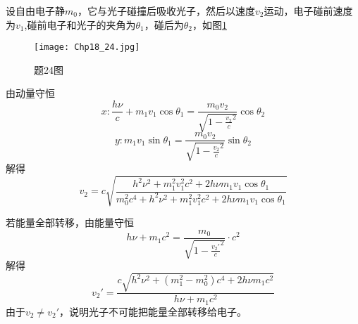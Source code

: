 \exercise

\solve 设自由电子静$m_0$，它与光子碰撞后吸收光子，然后以速度$v_2$运动，电子碰前速度为$v_1$,碰前电子和光子的夹角为$\theta_1$，碰后为$\theta_2$，如图\ref{Chp18_24}

\begin{figure}[htbp]
	\centering
	\texttt{[image: Chp18\_24.jpg]}
	\caption{题24图}
	\label{Chp18_24}
\end{figure}
由动量守恒
\[ x:\frac{h\nu}{c}+m_1v_1\cos\theta_1=\frac{m_0v_2}{\sqrt{1-\frac{v_2}{c}^2}}\cos\theta_2 \]
\[ y:m_1v_1\sin\theta_1=\frac{m_0v_2}{\sqrt{1-\frac{v_2}{c}^2}}\sin\theta_2 \]
解得
\[ v_2=c\sqrt{\frac{h^2\nu^2+m_1^2v_1^2c^2+2h\nu m_1v_1\cos\theta_1}{m_0^2c^4+h^2\nu^2+m_1^2v_1^2c^2+2h\nu m_1v_1\cos\theta_1}} \]

若能量全部转移，由能量守恒
\[ h\nu+m_1c^2=\frac{m_0}{\sqrt{1-\frac{v_2'}{c}^2}}\cdot c^2 \]
解得
\[v_2'=\frac{c\sqrt{h^2\nu^2+(m_1^2-m_0^2)c^4+2h\nu m_1c^2}}{h\nu+m_1c^2}  \]
由于$v_2\neq v_2'$，说明光子不可能把能量全部转移给电子。